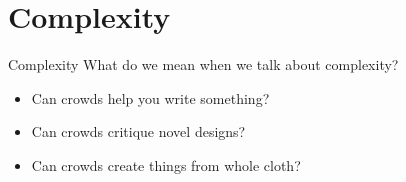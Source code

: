 \documentclass[presentation]{subfiles}
\begin{document}
\section{Complexity}

\begin{frame}{Complexity}
  What do we mean when we talk about complexity?
        \begin{itemize}
          \item<1->
          Can crowds help you write something?\\
          \scriptsize{\textcite{bernsteinSoylent,Kim:2014:CSI:2556288.2556986,Nebeling:2016:WCW:2858036.2858169}}\normalsize{}
          \item<2-> Can crowds critique novel designs?\\
          \scriptsize{\textcite{yuanAlmost,fuge2014analysis}}\normalsize{}
          \item<3-> Can crowds create things from whole cloth?\\
          \scriptsize{\textcite{KimStoria,Kim2017,Hahn:2016:KAB:2858036.2858364,Lasecki:2014:LSR:2661334.2661352}}\normalsize{}
        \end{itemize}


    
    
    

\end{frame}
\end{document}
